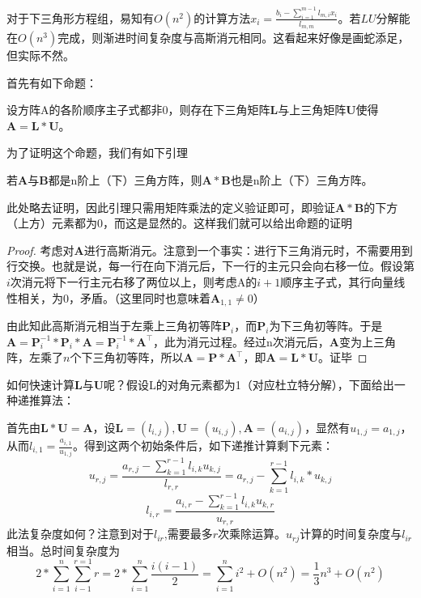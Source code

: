 对于下三角形方程组，易知有$O(n^2)$的计算方法$x_i=\frac{b_i-\sum_{i=1}^{m-1}l_{m,i}x_i}{l_{m,m}}$。若$LU$分解能在$O(n^3)$完成，则渐进时间复杂度与高斯消元相同。这看起来好像是画蛇添足，但实际不然。

首先有如下命题：
\begin{proposition}
	设方阵A的各阶顺序主子式都非0，则存在下三角矩阵$\boldsymbol L$与上三角矩阵$\boldsymbol U$使得$\boldsymbol A=\boldsymbol L*\boldsymbol U$。
\end{proposition}

为了证明这个命题，我们有如下引理

\begin{lemma}
	若$\boldsymbol A$与$\boldsymbol B$都是n阶上（下）三角方阵，则$\boldsymbol A*\boldsymbol B$也是n阶上（下）三角方阵。
\end{lemma}

此处略去证明，因此引理只需用矩阵乘法的定义验证即可，即验证$\boldsymbol A*\boldsymbol B$的下方（上方）元素都为0，而这是显然的。这样我们就可以给出命题的证明
\begin{proof}
	考虑对$\boldsymbol A$进行高斯消元。注意到一个事实：进行下三角消元时，不需要用到行交换。也就是说，每一行在向下消元后，下一行的主元只会向右移一位。假设第$i$次消元将下一行主元右移了两位以上，则考虑A的$i+1$顺序主子式，其行向量线性相关，为0，矛盾。（这里同时也意味着$\boldsymbol A_{1,1}\not=0$）

	由此知此高斯消元相当于左乘上三角初等阵$\boldsymbol P_i$，而$\boldsymbol P_i$为下三角初等阵。于是$\boldsymbol A=\boldsymbol P_i^{-1}*\boldsymbol P_i*\boldsymbol A=\boldsymbol P_i^{-1}*\boldsymbol A^\top$，此为消元过程。经过n次消元后，$\boldsymbol A$变为上三角阵，左乘了$n$个下三角初等阵，所以$\boldsymbol A=\boldsymbol P*\boldsymbol A^\top$，即$\boldsymbol A=\boldsymbol L*\boldsymbol U$。\hspace{3cm}证毕
\end{proof}

如何快速计算$\boldsymbol L$与$\boldsymbol U$呢？假设L的对角元素都为1（对应杜立特分解），下面给出一种递推算法：

首先由$\boldsymbol L*\boldsymbol U=\boldsymbol A$，设$\boldsymbol L=(l_{i,j}),\boldsymbol U=(u_{i,j}),\boldsymbol A=(a_{i,j})$，显然有$u_{1,j}=a_{1,j}$，从而$l_{i,1}=\frac{a_{i,1}}{u_{1,j}}$。得到这两个初始条件后，如下递推计算剩下元素：
\[u_{r,j}=\frac{a_{r,j}-\sum_{k=1}^{r-1}l_{i,k}u_{k,j}}{l_{r,r}}=a_{r,j}-\sum_{k=1}^{r-1}l_{i,k}*u_{k,j}\]
\[l_{i,r}=\frac{a_{i,r}-\sum_{k=1}^{r-1}l_{i,k}u_{k,r}}{u_{r,r}}\]
此法复杂度如何？注意到对于$l_{ir}$,需要最多$r$次乘除运算。$u_{rj}$计算的时间复杂度与$l_{ir}$相当。总时间复杂度为
\[2*\sum_{i=1}^{n}\sum^{r=1}_{i-1}r=2*\sum_{i=1}^{n}\frac{i(i-1)}{2}=\sum_{i=1}^{n}i^2+O(n^2)=\frac{1}{3}n^3+O(n^2)\]


